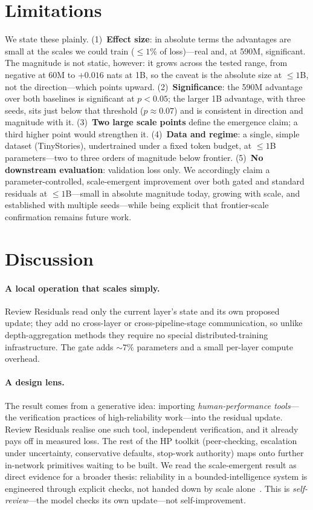 \documentclass[11pt]{article}
\begin{document}
\section{Limitations}\label{sec:limits}
We state these plainly. (1)~\textbf{Effect size}: in absolute terms the advantages are small at the scales we could train
($\le 1\%$ of loss)---real and, at 590M, significant. The magnitude is not static, however: it grows across the
tested range, from negative at 60M to $+0.016$ nats at 1B, so the caveat is the absolute size at $\le 1$B, not
the direction---which points upward. (2)~\textbf{Significance}: the 590M advantage over both baselines is significant at $p<0.05$; the larger
1B advantage, with three seeds, sits just below that threshold ($p\approx0.07$) and is consistent in direction
and magnitude with it. (3)~\textbf{Two large scale points} define
the emergence claim; a third higher point would strengthen it. (4)~\textbf{Data and regime}: a single, simple
dataset (TinyStories), undertrained under a fixed token budget, at $\le 1$B parameters---two to three orders of
magnitude below frontier. (5)~\textbf{No downstream evaluation}: validation loss only. We accordingly claim a parameter-controlled, scale-emergent improvement over both gated and standard
residuals at $\le 1$B---small in absolute magnitude today, growing with scale, and established with multiple
seeds---while being explicit that frontier-scale confirmation remains future work.

\section{Discussion}
\enlargethispage{\baselineskip}
\paragraph{A local operation that scales simply.} Review Residuals read only the current layer's state and its
own proposed update; they add no cross-layer or cross-pipeline-stage communication, so unlike depth-aggregation
methods they require no special distributed-training infrastructure. The gate adds ${\sim}7\%$ parameters and a
small per-layer compute overhead.
\paragraph{A design lens.} The result comes from a generative idea: importing \emph{human-performance
tools}---the verification practices of high-reliability work---into the residual update. Review Residuals realise
one such tool, independent verification, and it already pays off in measured loss. The rest of the HP toolkit
(peer-checking, escalation under uncertainty, conservative defaults, stop-work authority) maps onto further
in-network primitives waiting to be built. We read the scale-emergent result as direct evidence for a broader
thesis: reliability in a bounded-intelligence system is engineered through explicit checks, not handed down by
scale alone~\cite{kramer2026}. This is \emph{self-review}---the model checks its own update---not
self-improvement.
\end{document}
